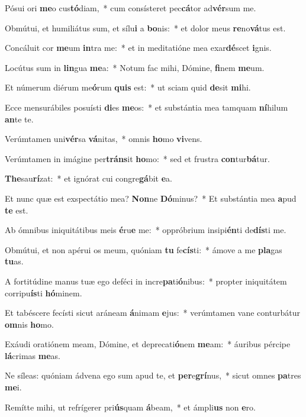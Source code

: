 \item Pósui ori \textbf{me}o cus\textbf{tó}diam,~* cum consísteret pec\textbf{cá}tor ad\textbf{vér}sum me.
\item Obmútui, et humiliátus sum, et sílu\textbf{i} a \textbf{bo}nis:~* et dolor meus \textbf{re}no\textbf{vá}tus est.
\item Concáluit cor \textbf{me}um \textbf{in}tra me:~* et in meditatióne mea exar\textbf{dé}scet \textbf{i}gnis.
\item Locútus sum in \textbf{lin}gua \textbf{me}a:~* Notum fac mihi, Dómine, \textbf{fi}nem \textbf{me}um.
\item Et númerum diérum me\textbf{ó}rum \textbf{quis} est:~* ut sciam quid \textbf{de}sit \textbf{mi}hi.
\item Ecce mensurábiles posuísti \textbf{di}es \textbf{me}os:~* et substántia mea tamquam \textbf{ní}hilum \textbf{an}te te.
\item Verúmtamen uni\textbf{vér}sa \textbf{vá}nitas,~* omnis \textbf{ho}mo \textbf{vi}vens.
\item Verúmtamen in imágine per\textbf{tráns}it \textbf{ho}mo:~* sed et frustra \textbf{con}tur\textbf{bá}tur.
\item \textbf{The}sau\textbf{rí}zat:~* et ignórat cui congre\textbf{gá}bit \textbf{e}a.
\item Et nunc quæ est exspectátio mea? \textbf{Non}ne \textbf{Dó}minus?~* Et substántia mea \textbf{a}pud \textbf{te} est.
\item Ab ómnibus iniquitátibus meis \textbf{é}ru\textbf{e} me:~* oppróbrium insipi\textbf{én}ti de\textbf{dís}ti me.
\item Obmútui, et non apérui os meum, quóniam \textbf{tu} fe\textbf{cís}ti:~* ámove a me \textbf{pla}gas \textbf{tu}as.
\item A fortitúdine manus tuæ ego deféci in incre\textbf{pa}ti\textbf{ó}nibus:~* propter iniquitátem corripu\textbf{ís}ti \textbf{hó}minem.
\item Et tabéscere fecísti sicut aráneam \textbf{á}nimam \textbf{e}jus:~* verúmtamen vane conturbátur \textbf{om}nis \textbf{ho}mo.
\item Exáudi oratiónem meam, Dómine, et deprecati\textbf{ó}nem \textbf{me}am:~* áuribus pércipe \textbf{lá}crimas \textbf{me}as.
\item Ne síleas: quóniam ádvena ego sum apud te, et \textbf{per}e\textbf{grí}nus,~* sicut omnes \textbf{pa}tres \textbf{me}i.
\item Remítte mihi, ut refrígerer pri\textbf{ús}quam \textbf{á}beam,~* et ámpli\textbf{us} non \textbf{e}ro.
